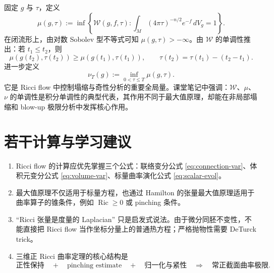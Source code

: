 \documentclass[11pt,a4paper,cn,nofont,math=cm,mode=fancy,bibtex]{elegantbook}
\numberwithin{equation}{chapter}
\numberwithin{figure}{chapter}
\newcommand{\Ric}{\operatorname{Ric}}
\begin{document}
固定 $g$ 与 $\tau$，定义
\begin{equation}\label{eq:mu-functional}
  \mu(g,\tau)
  :=\inf\left\{\mathcal W(g,f,\tau):
  \int_M(4\pi\tau)^{-n/2}e^{-f}\,dV_g=1\right\}.
\end{equation}
在闭流形上，由对数 Sobolev 型不等式可知 $\mu(g,\tau)>-\infty$。由 $\mathcal W$ 的单调性推出：若 $t_1\le t_2$，则
\begin{equation}\label{eq:mu-monotone}
  \mu(g(t_2),\tau(t_2))
  \ge
  \mu(g(t_1),\tau(t_1)),
  \qquad \tau(t_2)=\tau(t_1)-(t_2-t_1).
\end{equation}
进一步定义
\begin{equation}\label{eq:nu-functional}
  \nu_T(g):=\inf_{0<\tau\le T}\mu(g,\tau).
\end{equation}
它是 Ricci flow 中控制塌缩与奇性分析的重要全局量。课堂笔记中强调：$\mathcal W$、$\mu$、$\nu$ 的单调性是积分单调性的典型代表，其作用不同于最大值原理，却能在非局部塌缩和 blow-up 极限分析中发挥核心作用。


\chapter{若干计算与学习建议}

\begin{enumerate}[label=\textup{(\arabic*)}]
  \item Ricci flow 的计算应优先掌握三个公式：联络变分公式 \eqref{eq:connection-var}、体积元变分公式 \eqref{eq:volume-var}、标量曲率演化公式 \eqref{eq:scalar-evol}。
  \item 最大值原理不仅适用于标量方程，也通过 Hamilton 的张量最大值原理适用于曲率算子的锥条件，例如 $\Ric\ge0$ 或 pinching 条件。
  \item ``Ricci 张量是度量的 Laplacian'' 只是启发式说法。由于微分同胚不变性，不能直接把 Ricci flow 当作坐标分量上的普通热方程；严格抛物性需要 DeTurck trick。
  \item 三维正 Ricci 曲率定理的核心结构是
  \[
    \text{正性保持}\quad+\quad\text{pinching estimate}\quad+\quad\text{归一化与紧性}\quad\Longrightarrow\quad\text{常正截面曲率极限}.
  \]
\end{enumerate}
\printbibliography
\end{document}
